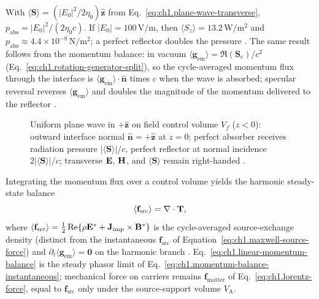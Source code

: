 \begin{example}
\label{ex:ch1.radiation-pressure}
With $\langle\mathbf{S}\rangle=(|E_0|^2/2\eta_0)\hat{\mathbf{z}}$ from Eq.~\eqref{eq:ch1.plane-wave-transverse}, $p_{\mathrm{abs}}=|E_0|^2/(2\eta_0 c)$. If $|E_0|=100\,\mathrm{V/m}$, then $\langle S_z\rangle=13.2\,\mathrm{W/m^2}$ and $p_{\mathrm{abs}}\approx4.4\times10^{-8}\,\mathrm{N/m^2}$; a perfect reflector doubles the pressure \cite{stratton1941}. The same result follows from the momentum balance: in vacuum $\langle\mathbf{g}_{\mathrm{em}}\rangle=\Re(\mathbf{S}_\mathrm{c})/c^2$ (Eq.~\eqref{eq:ch1.rotation-generator-split}), so the cycle-averaged momentum flux through the interface is $\langle\mathbf{g}_{\mathrm{em}}\rangle\cdot\hat{\mathbf{n}}$ times $c$ when the wave is absorbed; specular reversal reverses $\langle\mathbf{g}_{\mathrm{em}}\rangle$ and doubles the magnitude of the momentum delivered to the reflector \cite{stratton1941}.
\end{example}

\begin{figure}[t]
\centering
\VolIPhysFig{\VolIPhysPlaneWaveRadiationPressure}
\caption{Uniform plane wave in $+\hat{\mathbf{z}}$ on field control volume $V_f$ ($z<0$): outward interface normal $\hat{\mathbf{n}}=+\hat{\mathbf{z}}$ at $z=0$; perfect absorber receives radiation pressure $|\langle\mathbf{S}\rangle|/c$, perfect reflector at normal incidence $2|\langle\mathbf{S}\rangle|/c$; transverse $\mathbf{E}$, $\mathbf{H}$, and $\langle\mathbf{S}\rangle$ remain right-handed \cite{stratton1941,maxwell1873}.}
\label{fig:ch1.plane-wave-handedness}
\end{figure}
Integrating the momentum flux over a control volume yields the harmonic steady-state balance
\begin{equation}
\label{eq:ch1.linear-momentum-balance}
\langle\mathbf{f}_{\mathrm{src}}\rangle=\nabla\cdot\mathbf{T},
\end{equation}
where \(\langle\mathbf{f}_{\mathrm{src}}\rangle=\tfrac12\Re\{\rho\mathbf{E}^*+\mathbf{J}_{\mathrm{imp}}\times\mathbf{B}^*\}\) is the cycle-averaged source-exchange density (distinct from the instantaneous \(\mathbf{f}_{\mathrm{src}}\) of Equation~\eqref{eq:ch1.maxwell-source-force}) and \(\partial_t\langle\mathbf{g}_{\mathrm{em}}\rangle=\mathbf{0}\) on the harmonic branch \cite{stratton1941}. Eq.~\eqref{eq:ch1.linear-momentum-balance} is the steady phasor limit of Eq.~\eqref{eq:ch1.momentum-balance-instantaneous}; mechanical force on carriers remains \(\mathbf{f}_{\mathrm{matter}}\) of Eq.~\eqref{eq:ch1.lorentz-force}, equal to \(\mathbf{f}_{\mathrm{src}}\) only under the source-support volume $V_{\mathrm{A}}$.

